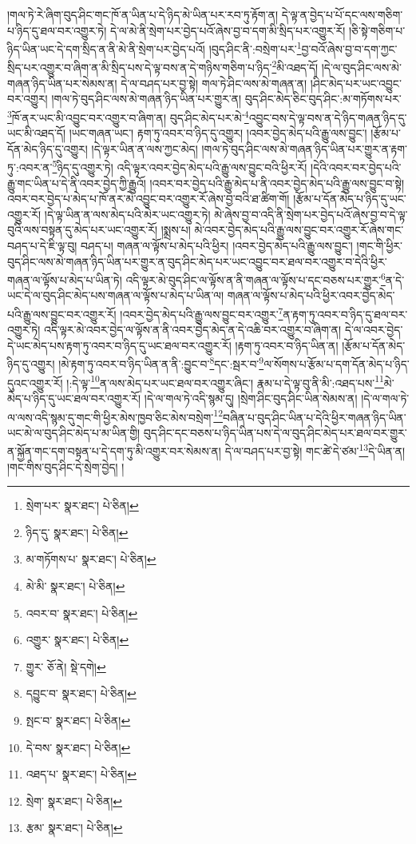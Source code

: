 །གལ་ཏེ་རེ་ཞིག་བུད་ཤིང་གང་ཁོ་ན་ཡིན་པ་དེ་ཉིད་མེ་ཡིན་པར་རབ་ཏུ་རྟོག་ན། དེ་ལྟ་ན་བྱེད་པ་པོ་དང་ལས་གཅིག་པ་ཉིད་དུ་ཐལ་བར་འགྱུར་ཏེ། དེ་ལ་མེ་ནི་སྲེག་པར་བྱེད་པའོ་ཞེས་བྱ་བ་དག་མི་སྲིད་པར་འགྱུར་རོ། །ཅི་སྟེ་གཅིག་པ་ཉིད་ཡིན་ཡང་དེ་དག་སྲིད་ན་ནི་མེ་ནི་སྲེག་པར་བྱེད་པའོ། །བུད་ཤིང་ནི་:བསྲེག་པར་\footnote{སྲེག་པར་  སྣར་ཐང་།  པེ་ཅིན། }བྱ་བའོ་ཞེས་བྱ་བ་དག་ཀྱང་སྲིད་པར་འགྱུར་བ་ཞིག་ན་མི་སྲིད་པས་དེ་ལྟ་བས་ན་དེ་གཉིས་གཅིག་པ་ཉིད་\footnote{ཉིད་དུ་  སྣར་ཐང་།  པེ་ཅིན། }མི་འཐད་དོ། །དེ་ལ་བུད་ཤིང་ལས་མེ་གཞན་ཉིད་ཡིན་པར་སེམས་ན། དེ་ལ་བཤད་པར་བྱ་སྟེ། གལ་ཏེ་ཤིང་ལས་མེ་གཞན་ན། །ཤིང་མེད་པར་ཡང་འབྱུང་བར་འགྱུར། །གལ་ཏེ་བུད་ཤིང་ལས་མེ་གཞན་ཉིད་ཡིན་པར་གྱུར་ན། བུད་ཤིང་མེད་ཅིང་བུད་ཤིང་:མ་གཏོགས་པར་\footnote{མ་གཏོགས་པ་  སྣར་ཐང་།  པེ་ཅིན། }ཁོ་ནར་ཡང་མི་འབྱུང་བར་འགྱུར་བ་ཞིག་ན། བུད་ཤིང་མེད་པར་མེ་\footnote{མེ་མི་  སྣར་ཐང་།  པེ་ཅིན། }འབྱུང་བས་དེ་ལྟ་བས་ན་དེ་ཉིད་གཞན་ཉིད་དུ་ཡང་མི་འཐད་དོ། །ཡང་གཞན་ཡང་། རྟག་ཏུ་འབར་བ་ཉིད་དུ་འགྱུར། །འབར་བྱེད་མེད་པའི་རྒྱུ་ལས་བྱུང་། །རྩོམ་པ་དོན་མེད་ཉིད་དུ་འགྱུར། །དེ་ལྟར་ཡིན་ན་ལས་ཀྱང་མེད། །གལ་ཏེ་བུད་ཤིང་ལས་མེ་གཞན་ཉིད་ཡིན་པར་གྱུར་ན་རྟག་ཏུ་:འབར་ན་\footnote{འབར་བ་  སྣར་ཐང་།  པེ་ཅིན། }ཉིད་དུ་འགྱུར་ཏེ། འདི་ལྟར་འབར་བྱེད་མེད་པའི་རྒྱུ་ལས་བྱུང་བའི་ཕྱིར་རོ། །དེའི་འབར་བར་བྱེད་པའི་རྒྱུ་གང་ཡིན་པ་དེ་ནི་འབར་བྱེད་ཀྱི་རྒྱུའོ། །འབར་བར་བྱེད་པའི་རྒྱུ་མེད་པ་ནི་འབར་བྱེད་མེད་པའི་རྒྱུ་ལས་བྱུང་བ་སྟེ། འབར་བར་བྱེད་པ་མེད་པ་ཁོ་ནར་མེ་འབྱུང་བར་འགྱུར་རོ་ཞེས་བྱ་བའི་ཐ་ཚིག་གོ། །རྩོམ་པ་དོན་མེད་པ་ཉིད་དུ་ཡང་འགྱུར་རོ། །དེ་ལྟ་ཡིན་ན་ལས་མེད་པའི་མེར་ཡང་འགྱུར་ཏེ། མེ་ཞེས་བྱ་བ་འདི་ནི་སྲེག་པར་བྱེད་པའོ་ཞེས་བྱ་བ་དེ་ལྟ་བུའི་ལས་བསྟན་དུ་མེད་པར་ཡང་འགྱུར་རོ། །སྨྲས་པ། མེ་འབར་བྱེད་མེད་པའི་རྒྱུ་ལས་བྱུང་བར་འགྱུར་རོ་ཞེས་གང་བཤད་པ་དེ་ཇི་ལྟ་བུ། བཤད་པ། གཞན་ལ་ལྟོས་པ་མེད་པའི་ཕྱིར། །འབར་བྱེད་མེད་པའི་རྒྱུ་ལས་བྱུང་། །གང་གི་ཕྱིར་བུད་ཤིང་ལས་མེ་གཞན་ཉིད་ཡིན་པར་གྱུར་ན་བུད་ཤིང་མེད་པར་ཡང་འབྱུང་བར་ཐལ་བར་འགྱུར་བ་དེའི་ཕྱིར་གཞན་ལ་ལྟོས་པ་མེད་པ་ཡིན་ཏེ། འདི་ལྟར་མེ་བུད་ཤིང་ལ་ལྟོས་ན་ནི་གཞན་ལ་ལྟོས་པ་དང་བཅས་པར་གྱུར་\footnote{འགྱུར་  སྣར་ཐང་།  པེ་ཅིན། }ན་དེ་ཡང་དེ་ལ་བུད་ཤིང་མེད་པས་གཞན་ལ་ལྟོས་པ་མེད་པ་ཡིན་ལ། གཞན་ལ་ལྟོས་པ་མེད་པའི་ཕྱིར་འབར་བྱེད་མེད་པའི་རྒྱུ་ལས་བྱུང་བར་འགྱུར་རོ། །འབར་བྱེད་མེད་པའི་རྒྱུ་ལས་བྱུང་བར་འགྱུར་\footnote{གྱུར་  ཅོ་ནེ།  སྡེ་དགེ། }ན་རྟག་ཏུ་འབར་བ་ཉིད་དུ་ཐལ་བར་འགྱུར་ཏེ། འདི་ལྟར་མེ་འབར་བྱེད་ལ་ལྟོས་ན་ནི་འབར་བྱེད་མེད་ན་དེ་འཆི་བར་འགྱུར་བ་ཞིག་ན། དེ་ལ་འབར་བྱེད་དེ་ཡང་མེད་པས་རྟག་ཏུ་འབར་བ་ཉིད་དུ་ཡང་ཐལ་བར་འགྱུར་རོ། །རྟག་ཏུ་འབར་བ་ཉིད་ཡིན་ན། །རྩོམ་པ་དོན་མེད་ཉིད་དུ་འགྱུར། །མེ་རྟག་ཏུ་འབར་བ་ཉིད་ཡིན་ན་ནི་:བྱུང་བ་\footnote{དབྱུང་བ་  སྣར་ཐང་།  པེ་ཅིན། }དང་:སྦར་བ་\footnote{སྤང་བ་  སྣར་ཐང་།  པེ་ཅིན། }ལ་སོགས་པ་རྩོམ་པ་དག་དོན་མེད་པ་ཉིད་དུའང་འགྱུར་རོ། །:དེ་ལྟ་\footnote{དེ་བས་  སྣར་ཐང་།  པེ་ཅིན། }ན་ལས་མེད་པར་ཡང་ཐལ་བར་འགྱུར་ཞིང་། རྣམ་པ་དེ་ལྟ་བུ་ནི་མི་:འཐད་པས་\footnote{འཐད་པ་  སྣར་ཐང་།  པེ་ཅིན། }མེ་མེད་པ་ཉིད་དུ་ཡང་ཐལ་བར་འགྱུར་རོ། །དེ་ལ་གལ་ཏེ་འདི་སྙམ་དུ། །སྲེག་ཤིང་བུད་ཤིང་ཡིན་སེམས་ན། །དེ་ལ་གལ་ཏེ་ལ་ལས་འདི་སྙམ་དུ་གང་གི་ཕྱིར་མེས་ཁྱབ་ཅིང་མེས་བསྲེག་\footnote{སྲེག་  སྣར་ཐང་།  པེ་ཅིན། }བཞིན་པ་བུད་ཤིང་ཡིན་པ་དེའི་ཕྱིར་གཞན་ཉིད་ཡིན་ཡང་མེ་ལ་བུད་ཤིང་མེད་པ་མ་ཡིན་གྱི། བུད་ཤིང་དང་བཅས་པ་ཉིད་ཡིན་པས་དེ་ལ་བུད་ཤིང་མེད་པར་ཐལ་བར་གྱུར་ན་སྐྱོན་གང་དག་བསྟན་པ་དེ་དག་ཏུ་མི་འགྱུར་བར་སེམས་ན། དེ་ལ་བཤད་པར་བྱ་སྟེ། གང་ཚེ་དེ་ཙམ་\footnote{རྩམ་  སྣར་ཐང་།  པེ་ཅིན། }དེ་ཡིན་ན། །གང་གིས་བུད་ཤིང་དེ་སྲེག་བྱེད། །
